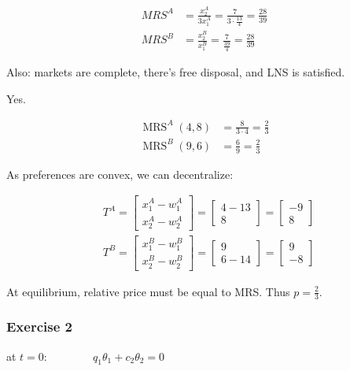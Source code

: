{\begin{enumerate}[label=(\alph*)]
{\begin{align*}
    M R S^A &= \frac{x_2^A}{3 x_1^A}=\frac{7}{3\cdot \frac{13}{4}}=\frac{28}{39} \\
    M R S^B &= \frac{x_2^B}{x_1^B}=\frac{7}{\frac{39}{4}}=\frac{28}{39}
\end{align*}

Also: markets are complete, there's free disposal, and LNS is satisfied.
}
{\item 
Yes. 

\begin{align*}
    \operatorname{MRS}^A(4,8) &= \frac{8}{3 \cdot 4}=\frac{2}{3} \\
    \operatorname{MRS}^B(9,6) &= \frac{6}{9}=\frac{2}{3}
\end{align*}

As preferences are convex, we can decentralize:

\begin{align*}
& T^A=\left[\begin{array}{l}
x_1^A-w_1^A \\
x_2^A-w_2^A
\end{array}\right]=\left[\begin{array}{c}
4-13 \\
8
\end{array}\right]=\left[\begin{array}{c}
-9 \\
8
\end{array}\right] \\
& T^B=\left[\begin{array}{l}
x_1^B-w_1^B \\
x_2^B-w_2^B
\end{array}\right]=\left[\begin{array}{c}
9 \\
6-14
\end{array}\right]=\left[\begin{array}{c}
9 \\
-8
\end{array}\right]
\end{align*}

At equilibrium, relative price must be equal to MRS. Thus $p=\frac{2}{3}$.
}
\end{enumerate}

\subsubsection*{Exercise 2}

\begin{enumerate}[label=(\alph*)]
{\item
at $t=0: \quad\quad\quad\quad q_1 \theta_1+c_2 \theta_2=0$ 

}
\end{enumerate}}

